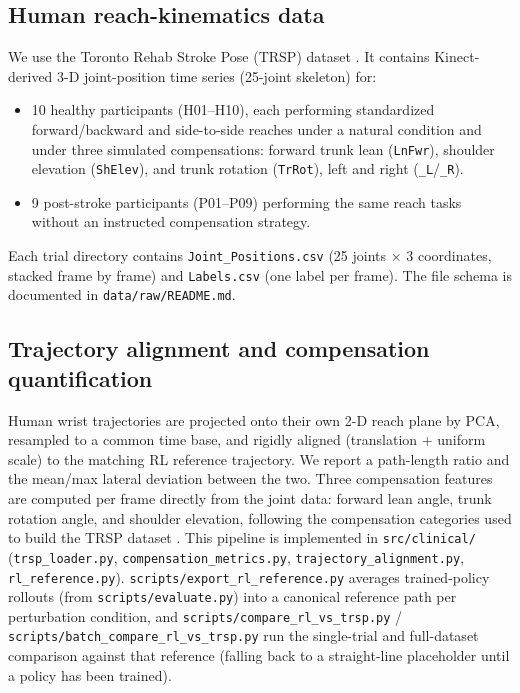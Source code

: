 \documentclass[11pt]{article}
\begin{document}
\subsection{Human reach-kinematics data}

We use the Toronto Rehab Stroke Pose (TRSP) dataset \citep{Dolatabadi2017,Zhi2018}. It contains Kinect-derived 3-D joint-position time series (25-joint skeleton) for:

\begin{itemize}
  \item 10 healthy participants (H01--H10), each performing standardized forward/backward and side-to-side reaches under a natural condition and under three simulated compensations: forward trunk lean (\texttt{LnFwr}), shoulder elevation (\texttt{ShElev}), and trunk rotation (\texttt{TrRot}), left and right (\texttt{\_L}/\texttt{\_R}).
  \item 9 post-stroke participants (P01--P09) performing the same reach tasks without an instructed compensation strategy.
\end{itemize}

Each trial directory contains \texttt{Joint\_Positions.csv} (25 joints $\times$ 3 coordinates, stacked frame by frame) and \texttt{Labels.csv} (one label per frame). The file schema is documented in \texttt{data/raw/README.md}.

\subsection{Trajectory alignment and compensation quantification}

Human wrist trajectories are projected onto their own 2-D reach plane by PCA, resampled to a common time base, and rigidly aligned (translation + uniform scale) to the matching RL reference trajectory. We report a path-length ratio and the mean/max lateral deviation between the two. Three compensation features are computed per frame directly from the joint data: forward lean angle, trunk rotation angle, and shoulder elevation, following the compensation categories used to build the TRSP dataset \citep{Zhi2018}. This pipeline is implemented in \texttt{src/clinical/} (\texttt{trsp\_loader.py}, \texttt{compensation\_metrics.py}, \texttt{trajectory\_alignment.py}, \texttt{rl\_reference.py}). \texttt{scripts/export\_rl\_reference.py} averages trained-policy rollouts (from \texttt{scripts/evaluate.py}) into a canonical reference path per perturbation condition, and \texttt{scripts/compare\_rl\_vs\_trsp.py} / \texttt{scripts/batch\_compare\_rl\_vs\_trsp.py} run the single-trial and full-dataset comparison against that reference (falling back to a straight-line placeholder until a policy has been trained).
\end{document}
